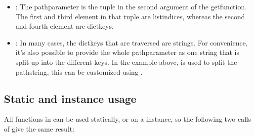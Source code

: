 \documentclass[a4paper,10pt,english]{sphinxmanual}
\begin{document}
\begin{sphinxVerbatim}[commandchars=\\\{\},numbers=left,firstnumber=1,stepnumber=1]
  \PYG{p}{[}  \PYG{p}{[}   \PYG{p}{]} \PYG{p}{[}  \PYG{p}{]}\PYG{p}{]}
    
 
\end{sphinxVerbatim}
\begin{itemize}
\item {}
\sphinxAtStartPar
{}: The path\sphinxhyphen{}parameter is the tuple in the second argument of the get\sphinxhyphen{}function. The first and third element in that tuple are list\sphinxhyphen{}indices, whereas the second and fourth element are dict\sphinxhyphen{}keys.

\item {}
\sphinxAtStartPar
{}: In many cases, the dict\sphinxhyphen{}keys that are traversed are strings. For convenience, it’s also possible to provide the whole path\sphinxhyphen{}parameter as one string that is split up into the different keys. In the example above,  is used to split the path\sphinxhyphen{}string, this can be customized using .

\end{itemize}


\subsection{Static and instance usage}
\label{\detokenize{README:static-and-instance-usage}}
\sphinxAtStartPar
All functions in  can be used statically, or on a \sphinxhyphen{}instance, so the following two calls of  give the same result:
\end{document}
